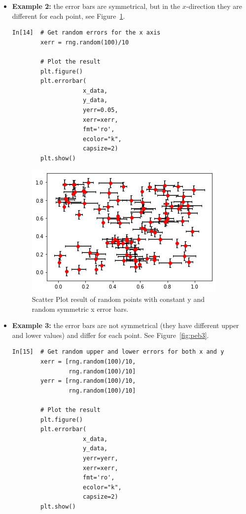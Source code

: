 \begin{itemize}
\item {\bf Example 2:}  the error bars are symmetrical, but in the $x$-direction they are different for each point, see Figure~\ref{fig:peb2}.

\begin{lstlisting}[style=PY]
In[14]  # Get random errors for the x axis 
        xerr = rng.random(100)/10
        
        # Plot the result
        plt.figure()
        plt.errorbar(
                    x_data,
                    y_data,
                    yerr=0.05,
                    xerr=xerr,
                    fmt='ro',
                    ecolor="k",
                    capsize=2)
        plt.show()
\end{lstlisting}

\begin{figure}[H]
	\centering
	\includegraphics[scale=0.75]{Pictures/Week6_random_scatter_w_rerrors.png}
\caption{Scatter Plot result of random points with constant y and random symmetric x error bars.}
\label{fig:peb2}
\end{figure}

\newpage

\item {\bf Example 3:} the error bars are not symmetrical (they have different upper and lower values) and differ for each point. See Figure~\ref{fig:peb3}.

\begin{lstlisting}[style=PY]
In[15]  # Get random upper and lower errors for both x and y
        xerr = [rng.random(100)/10,
                rng.random(100)/10]
        yerr = [rng.random(100)/10,
                rng.random(100)/10]
                
        # Plot the result
        plt.figure()
        plt.errorbar(
                    x_data,
                    y_data,
                    yerr=yerr,
                    xerr=xerr,
                    fmt='ro',
                    ecolor="k",
                    capsize=2)
        plt.show()
\end{lstlisting}


\end{itemize}
